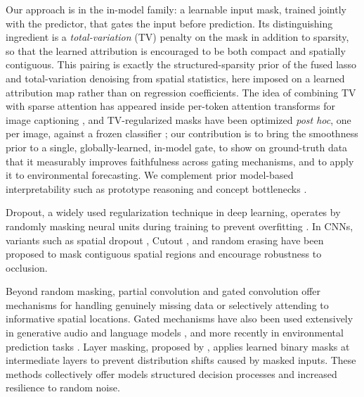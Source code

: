 \documentclass[12pt]{article}
\begin{document}
Our approach is in the in-model family: a learnable input mask, trained jointly with the predictor, that gates the input before prediction. Its distinguishing ingredient is a \emph{total-variation} (TV) penalty on the mask in addition to sparsity, so that the learned attribution is encouraged to be both compact and spatially contiguous. This pairing is exactly the structured-sparsity prior of the fused lasso \citep{Tibshirani2005FusedLasso} and total-variation denoising \citep{ROF1992} from spatial statistics, here imposed on a learned attribution map rather than on regression coefficients. The idea of combining TV with sparse attention has appeared inside per-token attention transforms for image captioning \citep{Martins2020TVMax}, and TV-regularized masks have been optimized \emph{post hoc}, one per image, against a frozen classifier \citep{Fong2017MeaningfulPerturbation,Dabkowski2017RealTime}; our contribution is to bring the smoothness prior to a single, globally-learned, in-model gate, to show on ground-truth data that it measurably improves faithfulness across gating mechanisms, and to apply it to environmental forecasting. We complement prior model-based interpretability such as prototype reasoning \citep{Chen2019ProtoPNet} and concept bottlenecks \citep{Koh2020CBM}.


Dropout, a widely used regularization technique in deep learning, operates by randomly masking neural units during training to prevent overfitting \citep{Hinton2012Dropout,Srivastava2014Dropout}. In CNNs, variants such as spatial dropout \citep{Tompson2015SpatialDropout,Wu2015DropoutCNN}, Cutout \citep{DeVries2017Cutout}, and random erasing \citep{Zhong2020RandomErasing} have been proposed to mask contiguous spatial regions and encourage robustness to occlusion.

Beyond random masking, partial convolution \citep{Liu2018PartialConv} and gated convolution \citep{Yu2019GatedConv} offer mechanisms for handling genuinely missing data or selectively attending to informative spatial locations. Gated mechanisms have also been used extensively in generative audio and language models \citep{Oord2016WaveNet,Dauphin2017GLU}, and more recently in environmental prediction tasks \citep{Zhang2024GatedRain}. Layer masking, proposed by \cite{Balasubramanian2023LayerMasking}, applies learned binary masks at intermediate layers to prevent distribution shifts caused by masked inputs. These methods collectively offer models structured decision processes and increased resilience to random noise. 
\end{document}

